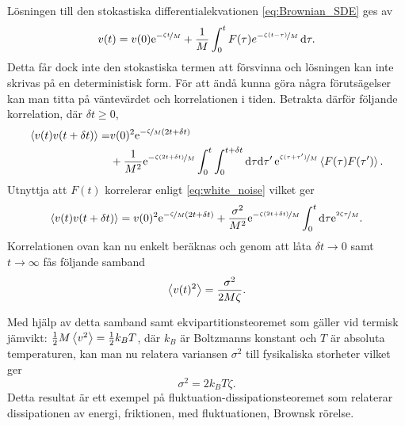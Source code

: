Lösningen till den stokastiska differentialekvationen
\eqref{eq:Brownian_SDE} ges av  
\begin{equation}
v(t)
=v(0)\mathrm{e}^{-\nicefrac{\zeta t}{M}}
 +\frac{1}{M}\int^t_0 F(\tau)e^{-\nicefrac{\zeta (t-\tau)}{M}} \,\mathrm{d}\tau.
\end{equation}
Detta får dock inte den stokastiska termen att försvinna och lösningen kan inte skrivas på en deterministisk form. För att ändå kunna göra några förutsägelser kan man titta på väntevärdet och korrelationen i tiden. Betrakta därför följande korrelation, där $\delta t\geq0$,
\begin{equation}
\begin{aligned}
\ev{v(t)v(t+\delta t)} 
=& v(0)^2\ee^{-\nicefrac{\zeta}{M}(2t+\delta t)}\\
 &+ \frac{1}{M^2}\ee^{-\nicefrac{\zeta (2t+\delta t)}{M}}
  \int_0^t\int_0^{t+\delta t}\dd\tau\dd\tau'\, 
     \ee^{\nicefrac{\zeta (\tau+\tau')}{M}}\ev{F(\tau)F(\tau')}.
\end{aligned}
\end{equation}
Utnyttja att $F(t)$ korrelerar enligt \eqref{eq:white_noise} vilket ger 
\begin{equation} \label{eq:Brown_korr}
\ev{v(t)v(t+\delta t)} 
= v(0)^2\ee^{-\nicefrac{\zeta}{M}(2t+\delta t)}
 +\frac{\sigma^2}{M^2}\ee^{-\nicefrac{\zeta (2t+\delta t)}{M}}
  \int_0^t\dd\tau\ee^{\nicefrac{2\zeta \tau}{M}}.
\end{equation}
Korrelationen ovan kan nu enkelt beräknas och genom att låta $\delta t\to 0$ samt $t\to \infty$ fås följande samband
\begin{equation}
    \ev{v(t)^2} = \frac{\sigma^2}{2M\zeta}.
\end{equation}

Med hjälp av detta samband samt ekvipartitionsteoremet som gäller vid termisk jämvikt: $\frac{1}{2}M\ev{v^2}=\frac{1}{2}k_BT$, där $k_B$ är Boltzmanns konstant och $T$ är absoluta temperaturen, kan man nu relatera variansen $\sigma^2$ till fysikaliska storheter vilket ger 
\begin{equation}
    \sigma^2 = 2k_BT\zeta.
\end{equation}
Detta resultat är ett exempel på fluktuation-dissipationsteoremet som relaterar dissipationen av energi, friktionen, med fluktuationen, Brownsk rörelse. 

